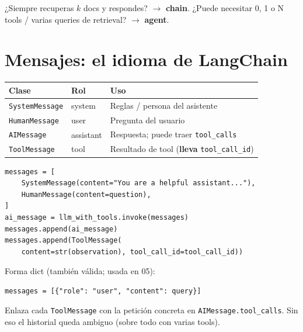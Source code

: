 \documentclass[11pt,a4paper]{article}
\begin{document}
\begin{lookup}[title=¿Chain o agent?]
¿Siempre recuperas $k$ docs y respondes? $\to$ \textbf{chain}.
¿Puede necesitar 0, 1 o N tools / varias queries de retrieval? $\to$ \textbf{agent}.
\end{lookup}

\section{Mensajes: el idioma de LangChain}

\begin{center}
\begin{tabular}{@{}llp{7.6cm}@{}}
\toprule
\textbf{Clase} & \textbf{Rol} & \textbf{Uso} \\
\midrule
\texttt{SystemMessage} & system & Reglas / persona del asistente \\
\texttt{HumanMessage} & user & Pregunta del usuario \\
\texttt{AIMessage} & assistant & Respuesta; puede traer \texttt{tool\_calls} \\
\texttt{ToolMessage} & tool & Resultado de tool (\textbf{lleva} \texttt{tool\_call\_id}) \\
\bottomrule
\end{tabular}
\end{center}

\begin{fromcode}[title=03/.../agent-loop-tool-calling.py]
\begin{lstlisting}
messages = [
    SystemMessage(content="You are a helpful assistant..."),
    HumanMessage(content=question),
]
ai_message = llm_with_tools.invoke(messages)
messages.append(ai_message)
messages.append(ToolMessage(
    content=str(observation), tool_call_id=tool_call_id))
\end{lstlisting}
\end{fromcode}

Forma dict (también válida; usada en 05):

\begin{lstlisting}
messages = [{"role": "user", "content": query}]
\end{lstlisting}

\begin{concept}[title=tool\_call\_id]
Enlaza cada \texttt{ToolMessage} con la petición concreta en \texttt{AIMessage.tool\_calls}.
Sin eso el historial queda ambiguo (sobre todo con varias tools).
\end{concept}
\end{document}
